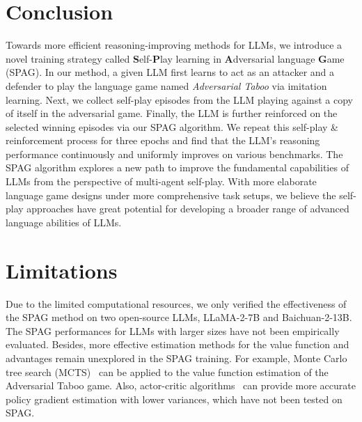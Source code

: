 \documentclass{article}
\theoremstyle{plain}
\theoremstyle{definition}
\theoremstyle{remark}
\begin{document}
\vspace{-2mm}
\section{Conclusion}
\vspace{-2mm}
Towards more efficient reasoning-improving methods for LLMs, we introduce a novel training strategy called \textbf{S}elf-\textbf{P}lay learning in \textbf{A}dversarial language \textbf{G}ame (SPAG).  In our method, a given LLM first learns to act as an attacker and a defender to play the language game named \textit{Adversarial Taboo} via imitation learning. Next, we collect self-play episodes from the LLM playing against a copy of itself in the adversarial game. Finally, the LLM is further reinforced on the selected winning episodes via our SPAG algorithm. We repeat this self-play \& reinforcement process for three epochs and find that the LLM's reasoning performance continuously and uniformly improves on various benchmarks. The SPAG algorithm explores a new path to improve the fundamental capabilities of LLMs from the perspective of multi-agent self-play. With more elaborate language game designs under more comprehensive task setups, we believe the self-play approaches have great potential for developing a broader range of advanced language abilities of LLMs. 


\section{Limitations} \label{sec:limitation}
\vspace{-2mm}
Due to the limited computational resources, we only verified the effectiveness of the SPAG method on two open-source LLMs, LLaMA-2-7B and Baichuan-2-13B. The SPAG performances for LLMs with larger sizes have not been empirically evaluated. %
Besides, more effective estimation methods for the value function and advantages remain unexplored in the SPAG training. For example, Monte Carlo tree search (MCTS)~\citep{coulom2006efficient} can be applied to the value function estimation of the Adversarial Taboo game. Also, actor-critic algorithms~\citep{konda1999actor} can provide more accurate policy gradient estimation with lower variances, which have not been tested on SPAG. 
\end{document}

